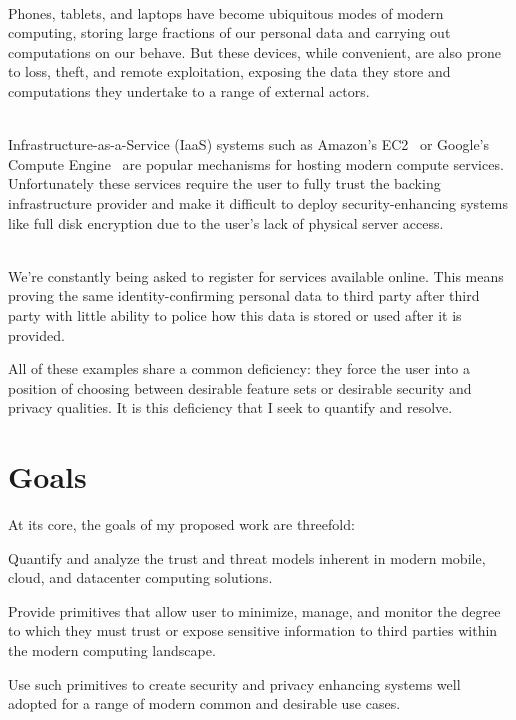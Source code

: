 \begin{packed_desc}
\item[Mobile Computing Devices] \hfill \\ Phones, tablets, and laptops
  have become ubiquitous modes of modern computing, storing large
  fractions of our personal data and carrying out computations on our
  behave. But these devices, while convenient, are also prone to loss,
  theft, and remote exploitation, exposing the data they store and
  computations they undertake to a range of external actors.
\item[Cloud Computing Infrastructure] \hfill
  \\ Infrastructure-as-a-Service (IaaS) systems such as Amazon's
  EC2~\cite{amazon-ec2} or Google's Compute
  Engine~\cite{google-compute} are popular mechanisms for hosting
  modern compute services. Unfortunately these services require the
  user to fully trust the backing infrastructure provider and make it
  difficult to deploy security-enhancing systems like full disk
  encryption due to the user's lack of physical server access.
\item[User Account Registration] \hfill \\ We're constantly being asked to
  register for services available online. This means proving the same
  identity-confirming personal data to third party after third party
  with little ability to police how this data is stored or used after
  it is provided.
\end{packed_desc}

All of these examples share a common deficiency: they force the user
into a position of choosing between desirable feature sets or desirable
security and privacy qualities. It is this deficiency that I seek to
quantify and resolve.

\section{Goals}
\label{chap:intro:goals}

At its core, the goals of my proposed work are threefold:

\begin{packed_item}
\item Quantify and analyze the trust and threat models inherent in
  modern mobile, cloud, and datacenter computing solutions.
\item Provide primitives that allow user to minimize, manage, and
  monitor the degree to which they must trust or expose sensitive
  information to third parties within the modern computing landscape.
\item Use such primitives to create security and privacy enhancing
  systems well adopted for a range of modern common and desirable use
  cases.
\end{packed_item}

